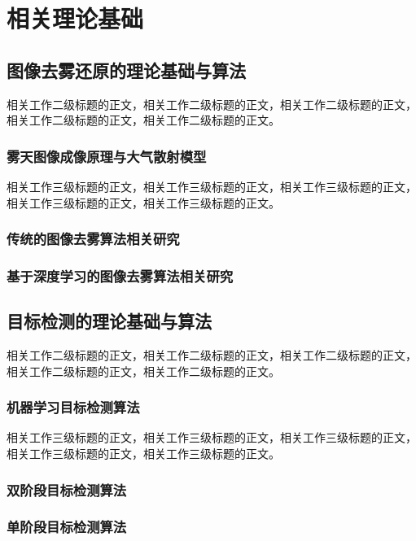 \section{相关理论基础\label{相关工作}}

\subsection{图像去雾还原的理论基础与算法}

相关工作二级标题的正文，相关工作二级标题的正文，相关工作二级标题的正文，相关工作二级标题的正文，相关工作二级标题的正文。

\subsubsection{雾天图像成像原理与大气散射模型}

相关工作三级标题的正文，相关工作三级标题的正文，相关工作三级标题的正文，相关工作三级标题的正文，相关工作三级标题的正文。

\subsubsection{传统的图像去雾算法相关研究}

\subsubsection{基于深度学习的图像去雾算法相关研究}


\subsection{目标检测的理论基础与算法}

相关工作二级标题的正文，相关工作二级标题的正文，相关工作二级标题的正文，相关工作二级标题的正文，相关工作二级标题的正文。

\subsubsection{机器学习目标检测算法}

相关工作三级标题的正文，相关工作三级标题的正文，相关工作三级标题的正文，相关工作三级标题的正文，相关工作三级标题的正文。

\subsubsection{双阶段目标检测算法}


\subsubsection{单阶段目标检测算法}




